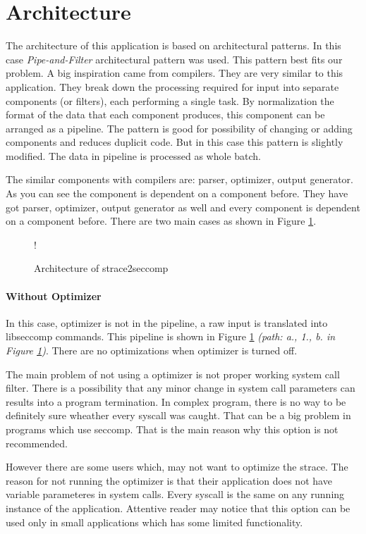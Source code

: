 \section{Architecture}
The architecture of this application is based on architectural patterns.
In this case \textit{Pipe-and-Filter} \cite{PipeAndFilter} architectural pattern was used.
This pattern best fits our  problem.
A big inspiration came from compilers.
They are very similar to this application.
They break down the processing required for input into separate components (or filters), each performing a single task.
By normalization the format of the data that each component produces, this component can be arranged as a pipeline.
The pattern is good for possibility of changing or adding components and reduces duplicit code.
But in this case this pattern is slightly modified.
The data in pipeline is processed as whole batch.

The similar components with compilers are: parser, optimizer, output generator.
As you can see the component is dependent on a component before.
They have got parser, optimizer, output generator as well and every component is dependent on a component before.
There are two main cases as shown in Figure \ref{fig:tikz:architecture}.

\begin{figure}[H]
  \centering
  \resizebox {\textwidth} {!} {
    
  }
  \caption{Architecture of strace2seccomp}
  \label{fig:tikz:architecture}
\end{figure}

\paragraph{Without Optimizer}
In this case, optimizer is not in the pipeline, a raw input is translated into libseccomp commands.
This pipeline is shown in Figure \ref{fig:tikz:architecture} \textit{(path: a., 1., b. in Figure \ref{fig:tikz:architecture})}.
There are no optimizations when optimizer is turned off.

The main problem of not using a optimizer is not proper working system call filter.
There is a possibility that any minor change in system call parameters can results into a program termination.
In complex program, there is no way to be definitely sure wheather every syscall was caught.
That can be a big problem in programs which use seccomp.
That is the main reason why this option is not recommended.

However there are some users which, may not want to optimize the strace.
The reason for not running the optimizer is that their application does not have variable parameteres in system calls.
Every syscall is the same on any running instance of the application.
Attentive reader may notice that this option can be used only in small applications which has some limited functionality.

